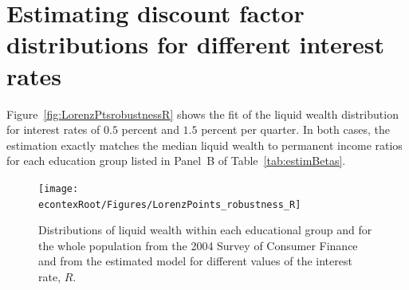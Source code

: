 \documentclass[\econtexRoot/HAFiscal]{subfiles}
\begin{document}

\hypertarget{Appendices}{} %

\hypertarget{Estimating-discount-factor-distributions-for-different-interest-rates}{}\par\section{Estimating discount factor distributions for different interest rates}
\notinsubfile{\label{app:DF_R}}



Figure~\ref{fig:LorenzPtsrobustnessR} shows the fit of the liquid wealth distribution for interest rates of $0.5$ percent and $1.5$ percent per quarter. In both cases, the estimation exactly matches the median liquid wealth to permanent income ratios for each education group listed in Panel~B of Table~\ref{tab:estimBetas}. 


\begin{figure}[th]
  \begin{center}
    \texttt{[image: \\econtexRoot/Figures/LorenzPoints\_robustness\_R]}
    \caption{Distributions of liquid wealth within each educational group and for the whole population from the 2004 Survey of Consumer Finance and from the estimated model for different values of the interest rate, $R$.}
    \notinsubfile{\label{fig:LorenzPtsrobustnessR}}
  \end{center}
\end{figure}
\end{document}
